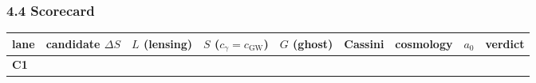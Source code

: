\documentclass[
]{article}
\newcounter{none} %
\begin{document}
\subsubsection{4.4 Scorecard}\label{scorecard}

{\def\LTcaptype{none} %
\begin{longtable}[]{@{}
  >{\raggedright\arraybackslash}p{}
  >{\raggedright\arraybackslash}p{}
  >{\raggedright\arraybackslash}p{}
  >{\raggedright\arraybackslash}p{}
  >{\raggedright\arraybackslash}p{}
  >{\raggedright\arraybackslash}p{}
  >{\raggedright\arraybackslash}p{}
  >{\raggedright\arraybackslash}p{}
  >{\raggedright\arraybackslash}p{}@{}}
\toprule\noalign{}
\begin{minipage}[b]{\linewidth}\raggedright
lane
\end{minipage} & \begin{minipage}[b]{\linewidth}\raggedright
candidate \(\Delta S\)
\end{minipage} & \begin{minipage}[b]{\linewidth}\raggedright
\(L\) (lensing)
\end{minipage} & \begin{minipage}[b]{\linewidth}\raggedright
\(S\) (\(c_\gamma=c_\mathrm{GW}\))
\end{minipage} & \begin{minipage}[b]{\linewidth}\raggedright
\(G\) (ghost)
\end{minipage} & \begin{minipage}[b]{\linewidth}\raggedright
Cassini
\end{minipage} & \begin{minipage}[b]{\linewidth}\raggedright
cosmology
\end{minipage} & \begin{minipage}[b]{\linewidth}\raggedright
\(a_0\)
\end{minipage} & \begin{minipage}[b]{\linewidth}\raggedright
verdict
\end{minipage} \\
\midrule\noalign{}
\endhead
\bottomrule\noalign{}
\endlastfoot
\textbf{C1} &

\end{longtable}}
\end{document}
